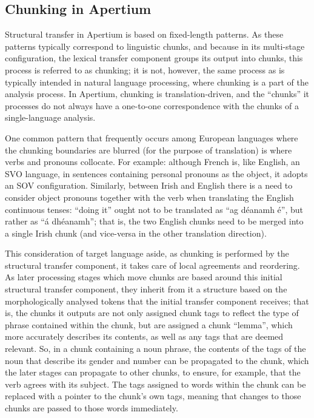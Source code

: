 \subsection{Chunking in Apertium}
\label{ssect:apertiumchunk}

Structural transfer in Apertium is based on fixed-length patterns. As these
patterns typically correspond to linguistic chunks, and because in its 
multi-stage configuration, the lexical transfer component groups its output
into chunks, this process is referred to as chunking; it is not, however,
the same process as is typically intended in natural language processing, where
chunking is a part of the analysis process. In Apertium, chunking is 
translation-driven, and the ``chunks'' it processes do not always have a
one-to-one correspondence with the chunks of a single-language analysis.

One common pattern that frequently occurs among European languages where the
chunking boundaries are blurred (for the purpose of translation) is where verbs
and pronouns collocate. For example: although French is, like English, an SVO
language, in sentences containing personal pronouns as the object, it adopts
an SOV configuration. Similarly, between Irish and English there is a need to
consider object pronouns together with the verb when translating the English
continuous tenses: ``doing it'' ought not to be translated as ``ag d\'eanamh \'e'',
but rather as ``\'a dh\'eanamh''; that is, the two English chunks need to be
merged into a single Irish chunk (and vice-versa in the other translation
direction).

This consideration of target language aside, as chunking is performed by the
structural transfer component, it takes care of local agreements and reordering.
As later processing stages which move chunks are based around this initial
structural transfer component, they inherit from it a structure based on the
morphologically analysed tokens that the initial transfer component receives;
that is, the chunks it outputs are not only assigned chunk tags to reflect
the type of phrase contained within the chunk, but are assigned a chunk ``lemma'',
which more accurately describes its contents, as well as any tags that are
deemed relevant. So, in a chunk containing a noun phrase, the contents of the
tags of the noun that describe its gender and number can be propagated to the
chunk, which the later stages can propagate to other chunks, to ensure, for 
example, that the verb agrees with its subject. The tags assigned to words within the chunk can
be replaced with a pointer to the chunk's own tags, meaning that changes to
those chunks are passed to those words immediately.

